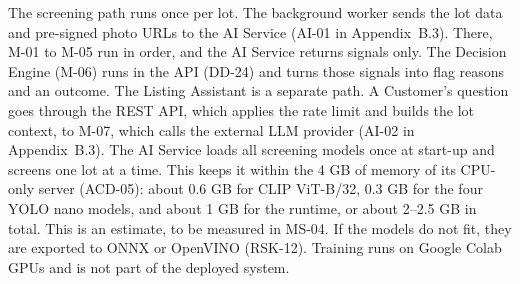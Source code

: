 The screening path runs once per lot. The background worker sends the lot data and
pre-signed photo URLs to the AI Service (AI-01 in Appendix~B.3). There, M-01 to M-05 run
in order, and the AI Service returns signals only. The Decision Engine (M-06) runs in the
API (DD-24) and turns those signals into flag reasons and an outcome. The Listing
Assistant is a separate path. A Customer's question goes through the REST API, which
applies the rate limit and builds the lot context, to M-07, which calls the external LLM
provider (AI-02 in Appendix~B.3). The AI Service loads all screening models once at
start-up and screens one lot at a time. This keeps it within the 4 GB of memory of its
CPU-only server (ACD-05): about 0.6 GB for CLIP ViT-B/32, 0.3 GB for the four YOLO nano
models, and about 1 GB for the runtime, or about 2--2.5 GB in total. This is an estimate,
to be measured in MS-04. If the models do not fit, they are exported to ONNX or OpenVINO
(RSK-12). Training runs on Google Colab GPUs and is not part of the deployed system.

